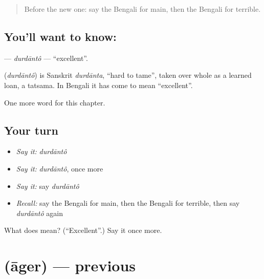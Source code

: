 \label{lesson:BN-C220-durdanto}



\begin{quote}
Before the new one: say the Bengali for main, then the Bengali for terrible.
\end{quote}

\subsection*{You'll want to know: }
\textbf{} — \emph{durdāntô} — \textquotedblleft{}excellent\textquotedblright{}.

\begin{cousinweb}
\textbf{} (\emph{durdāntô}) is Sanskrit \emph{durdānta}, \textquotedblleft{}hard to tame\textquotedblright{}, taken over whole as a learned loan, a tatsama. In Bengali it has come to mean \textquotedblleft{}excellent\textquotedblright{}.
\end{cousinweb}

\begin{grammarlens}[title={What you've built}]
One more word for this chapter.
\end{grammarlens}

\subsection*{Your turn}
\begin{itemize}
\raggedright
  \item \emph{Say it:} \emph{durdāntô}
  \item \emph{Say it:} \emph{durdāntô}, once more
  \item \emph{Say it:} say \emph{durdāntô}
  \item \emph{Recall:} say the Bengali for main, then the Bengali for terrible, then say \emph{durdāntô} again
\end{itemize}

\begin{tcolorbox}[breakable,colback=teal!4,colframe=teal!35!black,title={Before you move on}]
What does  mean? (\textquotedblleft{}Excellent\textquotedblright{}.) Say it once more.
\end{tcolorbox}
\section[\texorpdfstring{\bn{আগের} (āger)}{আগের (āger)}]{ (āger) — previous}

